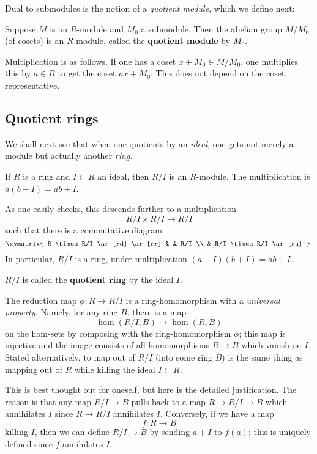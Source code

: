 Dual to submodules  is the notion of a \emph{quotient module}, which we define
next:
\begin{definition} Suppose $M$ is an $R$-module and $M_0$  a
submodule.  Then the abelian group $M/M_0$ (of cosets)  is an $R$-module,
called the \textbf{quotient module} by $M_0$.  

Multiplication is as follows. If
one has a coset $x  + M_0 \in M/M_0$, one  multiplies this by $a \in R$ to
get the coset $ax
+ M_0$. This does not depend on the coset representative.  
\end{definition} 


\subsection{Quotient rings}
We shall next see that when one quotients by an \emph{ideal}, one gets not
merely a module but actually another \emph{ring.}


If $R$ is a ring and $I \subset R$ an ideal, then $R/I$ is an $R$-module. The
multiplication is $a(b+I) = ab + I$. 

As one easily checks, this descends further to a multiplication 
\[ R/I \times R/I \to R/I  \] such that there is a commutative diagram
\[ \xymatrix{
R \times R/I \ar[rd] \ar[rr] & &  R/I \\
& R/I \times R/I \ar[ru] 
}.\]
In particular, $R/I$ is a ring, under multiplication $(a+I)(b+I) = ab+I$. 
\begin{definition} 
$R/I$ is called the \textbf{quotient ring} by the ideal $I$.
\end{definition} 

The
reduction map $\phi \colon R \to R/I$ is a ring-homomorphism with a
\emph{universal
property}.
Namely, for any ring $B$, there is a map
 \[ \hom(R/I, B) \to \hom(R, B)  \]
 on the hom-sets
 by composing with the ring-homomorphism $\phi$; this map is injective and the
 image consists of all homomorphisms $R \to B$ which vanish on $I$.  
Stated alternatively, to map out of $R/I$ (into some ring $B$) is the same thing as mapping out of
$R$ while killing the ideal $I \subset R$.

This is best thought out for oneself, but here is the detailed justification.
The reason is that any map $R/I \to B$ pulls back to a map $R \to R/I \to B$
which annihilates $I$ since $R \to R/I$ annihilates $I$. Conversely, if we have
a map 
\[ f: R \to B  \]
killing $I$, then we can define $R/I \to B$ by sending $a+I$ to $f(a)$; this is
uniquely defined since $f$ annihilates $I$.

